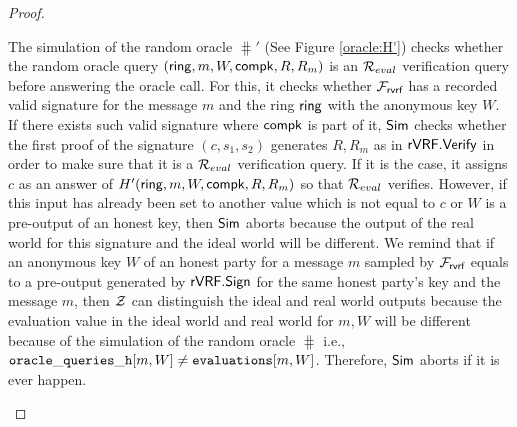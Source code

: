 \begin{proof}
\begin{itemize}
		The simulation of the random oracle $ \hash' $ (See Figure \ref{oracle:H'}) checks whether the random oracle query $ (\mathsf{ring},m,W,\mathsf{compk},R,R_m) $ is an $ \mathcal{R}_{eval} $ verification query before answering the oracle call. For this, it checks whether $ \mathcal{F}_{\textsf{rvrf}} $ has a recorded valid signature for the message $ m $ and the ring $ \mathsf{ring} $ with the anonymous key $ W $. If there exists such valid signature where $ \mathsf{compk} $ is part of it, $ \mathsf{Sim} $ checks whether the first proof of the signature $ (c,s_1, s_2) $ generates $ R, R_m $ as in $ {\mathsf{rVRF}}.{\mathsf{Verify}} $ in order to make sure that it is a $ \mathcal{R}_{eval} $ verification query. If it is the case, it assigns $ c $ as an answer of $ H' (\mathsf{ring},m,W,\mathsf{compk},R,R_m) $ so that $ \mathcal{R}_{eval} $ verifies. However, if this input has already been set to another value which is not equal to $ c $ or $ W $ is a pre-output of an honest key, then $ \mathsf{Sim} $ aborts because the output of the real world for this signature and the ideal world will be different.
		We remind that if an anonymous key $ W $ of an honest party  for a message $ m $ sampled by $ \mathcal{F}_{\textsf{rvrf}} $ equals to a pre-output generated by $ {\mathsf{rVRF}}.{\mathsf{Sign}} $  for the same honest party's key and the message $ m $, then $ \mathcal{Z} $ can distinguish the ideal and real world outputs because the evaluation value in the ideal world and real world for $ m,W $ will be different because of the simulation of the random oracle $ \hash $ i.e., $ \mathtt{oracle\_queries\_h}[m,W] \neq \texttt{evaluations}[m,W] $.  Therefore, $ \mathsf{Sim} $ aborts if it is ever happen.
		
		\begin{figure}
			\centering
			
			\noindent{}
\end{figure}
\end{itemize}
\end{proof}
